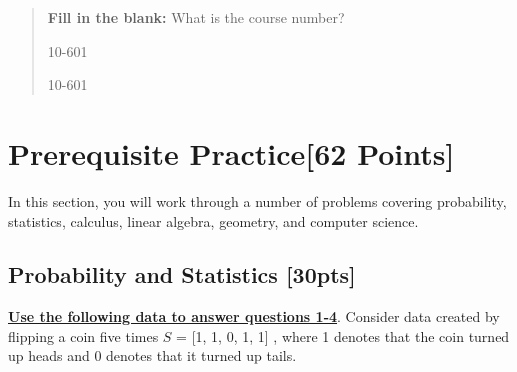 \documentclass[12pt]{article}
\begin{document}
\begin{quote}
\textbf{Fill in the blank:} What is the course number?

\begin{tcolorbox}[fit,height=1cm, width=4cm, blank, borderline={1pt}{-2pt},nobeforeafter]
    \begin{center}\huge10-601\end{center}
    \end{tcolorbox}\hspace{2cm}
    \begin{tcolorbox}[fit,height=1cm, width=4cm, blank, borderline={1pt}{-2pt},nobeforeafter]
    \begin{center}\huge10-601\end{center}
    \end{tcolorbox}
\end{quote}



\section{Prerequisite Practice[62 Points]}

In this section, you will work through a number of problems covering probability, statistics, calculus, linear algebra, geometry, and computer science. 

\subsection{Probability and Statistics [30pts]}

\textbf{\underline{Use the following data to answer questions 1-4}}. Consider data created by flipping a coin five times $S $ = [1, 1, 0, 1, 1] , where 1 denotes that the coin turned up heads and 0 denotes that it turned up tails. \bigskip
\end{document}

